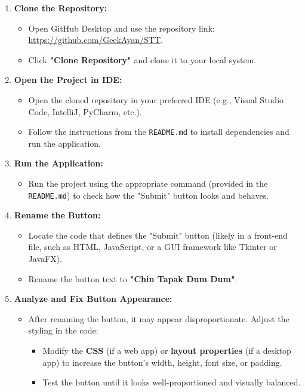 \documentclass[a4paper,12pt]{article}
\begin{document}
\begin{enumerate}[label=\arabic*.]
    \item \textbf{Clone the Repository:}
    \begin{itemize}
        \item Open GitHub Desktop and use the repository link: \url{https://github.com/GeekAyan/STT}.
        \item Click \textbf{"Clone Repository"} and clone it to your local system.
    \end{itemize}

    \item \textbf{Open the Project in IDE:}
    \begin{itemize}
        \item Open the cloned repository in your preferred IDE (e.g., Visual Studio Code, IntelliJ, PyCharm, etc.).
        \item Follow the instructions from the \texttt{README.md} to install dependencies and run the application.
    \end{itemize}

    \item \textbf{Run the Application:}
    \begin{itemize}
        \item Run the project using the appropriate command (provided in the \texttt{README.md}) to check how the "Submit" button looks and behaves.
    \end{itemize}

    \item \textbf{Rename the Button:}
    \begin{itemize}
        \item Locate the code that defines the "Submit" button (likely in a front-end file, such as HTML, JavaScript, or a GUI framework like Tkinter or JavaFX).
        \item Rename the button text to \textbf{"Chin Tapak Dum Dum"}.
    \end{itemize}

    \item \textbf{Analyze and Fix Button Appearance:}
    \begin{itemize}
        \item After renaming the button, it may appear disproportionate. Adjust the styling in the code:
        \begin{itemize}
            \item Modify the \textbf{CSS} (if a web app) or \textbf{layout properties} (if a desktop app) to increase the button's width, height, font size, or padding.
            \item Test the button until it looks well-proportioned and visually balanced.
        \end{itemize}
    \end{itemize}


\end{enumerate}
\end{document}
